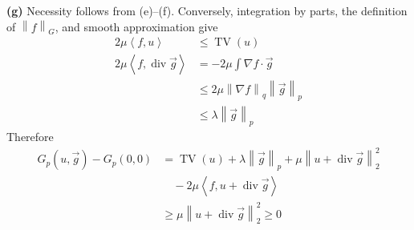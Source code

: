 \documentclass[12pt,letterpaper]{article}
\newcommand{\TV}{\operatorname{TV}}
\newcommand{\diver}{\operatorname{div}}
\newcommand{\norm}[1]{\left\lVert #1\right\rVert}
\newcommand{\ip}[2]{\left\langle #1,#2\right\rangle}
\newcommand{\partlabel}[1]{\par\medskip\noindent\textbf{(#1)}\enspace}
\begin{document}
\partlabel{g}
Necessity follows from (e)--(f). Conversely, integration by parts,
the definition of $\norm f_G$, and smooth approximation give
\begin{align*}
 2\mu\ip fu&\leq\TV(u)\\
 2\mu\ip f{\diver\vec g}
 &=-2\mu\int\nabla f\cdot\vec g\\
 &\leq2\mu\norm{\nabla f}_q\norm{\vec g}_p\\
 &\leq\lambda\norm{\vec g}_p
\end{align*}
Therefore
\begin{align*}
 G_p(u,\vec g)-G_p(0,0)
 &=\TV(u)+\lambda\norm{\vec g}_p
      +\mu\norm{u+\diver\vec g}_2^2\\
 &\quad-2\mu\ip f{u+\diver\vec g}\\
 &\geq\mu\norm{u+\diver\vec g}_2^2\geq0
 \tag*{$\square$}
\end{align*}
\end{document}
